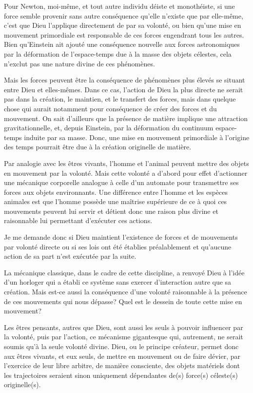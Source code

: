 Pour Newton, moi-même, et tout autre individu déiste et monothéiste, si une force semble provenir sans autre conséquence qu’elle n’existe que par elle-même, c’est que Dieu l'applique directement de par sa volonté, ou bien qu'une mise en mouvement primordiale est responsable de ces forces engendrant tous les autres. Bien qu'Einstein ait ajouté une conséquence nouvelle aux forces astronomiques par la déformation de l'espace-temps due à la masse des objets célestes, cela n’exclut pas une nature divine de ces phénomènes.

Mais les forces peuvent être la conséquence de phénomènes plus élevés se situant entre Dieu et elles-mêmes. Dans ce cas, l’action de Dieu la plus directe ne serait pas dans la création, le maintien, et le transfert des forces, mais dans quelque chose qui aurait notamment pour conséquence de créer des forces et du mouvement. On sait d’ailleurs que la présence de matière implique une attraction gravitationnelle, et, depuis Einstein, par la déformation du continuum espace-temps induite par sa masse. Donc, une mise en mouvement primordiale à l'origine des temps pourrait être due à la création originelle de matière.

Par analogie avec les êtres vivants, l’homme et l’animal peuvent mettre des objets en mouvement par la volonté. Mais cette volonté a d’abord pour effet d’actionner une mécanique corporelle analogue à celle d’un automate pour transmettre ses forces aux objets environnants. Une différence entre l’homme et les espèces animales est que l’homme possède une maîtrise supérieure de ce à quoi ces mouvements peuvent lui servir et détient donc une raison plus divine et raisonnable lui permettant d’exécuter ces actions.

Je me demande donc si Dieu maintient l'existence de forces et de mouvements par volonté directe ou si ses lois ont été établies préalablement et qu'aucune action de sa part n'est exécutée par la suite.

La mécanique classique, dans le cadre de cette discipline, a renvoyé Dieu à l'idée d'un horloger qui a établi ce système sans exercer d'interaction autre que sa création. Mais est-ce aussi la conséquence d'une volonté raisonnable à la présence de ces mouvements qui nous dépasse? Quel est le dessein de toute cette mise en mouvement?

Les êtres pensants, autres que Dieu, sont aussi les seuls à pouvoir influencer par la volonté, puis par l'action, ce mécanisme gigantesque qui, autrement, ne serait soumis qu'à la seule volonté divine. Dieu, ou le principe créateur, permet donc aux êtres vivants, et eux seuls, de mettre en mouvement ou de faire dévier, par l'exercice de leur libre arbitre, de manière consciente, des objets matériels dont les trajectoires seraient sinon uniquement dépendantes de(s) force(s) céleste(s) originelle(s).

